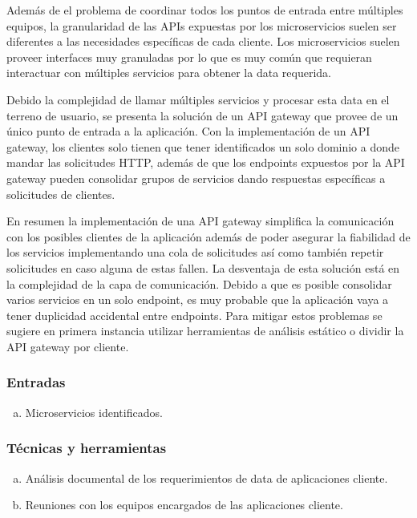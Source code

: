 Además de el problema de coordinar todos los puntos de entrada entre múltiples equipos,
la granularidad de las APIs expuestas por los microservicios suelen ser diferentes
a las necesidades específicas de cada cliente.
Los microservicios suelen proveer interfaces muy granuladas por lo que es muy común que
requieran interactuar con múltiples servicios para obtener la data requerida.

Debido la complejidad de llamar múltiples servicios y procesar esta data en el terreno de usuario,
se presenta la solución de un API gateway que provee de un único punto de entrada a la aplicación. 
Con la implementación de un API gateway, los clientes solo tienen que tener identificados un solo
dominio a donde mandar las solicitudes HTTP, además de que los endpoints expuestos por la API gateway
pueden consolidar grupos de servicios dando respuestas específicas a solicitudes de clientes.

En resumen la implementación de una API gateway simplifica la comunicación con los posibles clientes
de la aplicación además de poder asegurar la fiabilidad de los servicios implementando
una cola de solicitudes así como también repetir solicitudes en caso alguna de estas fallen.
La desventaja de esta solución está en la complejidad de la capa de comunicación.
Debido a que es posible consolidar varios servicios en un solo endpoint, es muy probable
que la aplicación vaya a tener duplicidad accidental entre endpoints.
Para mitigar estos problemas se sugiere en primera instancia utilizar herramientas de
análisis estático o dividir la API gateway por cliente.


\subsubsection*{Entradas}
\begin{enumerate}[a.]
  \item Microservicios identificados.
\end{enumerate}

\subsubsection*{Técnicas y herramientas}
\begin{enumerate}[a.]
  \item Análisis documental de los requerimientos de data de aplicaciones cliente.
  \item Reuniones con los equipos encargados de las aplicaciones cliente.
\end{enumerate}

